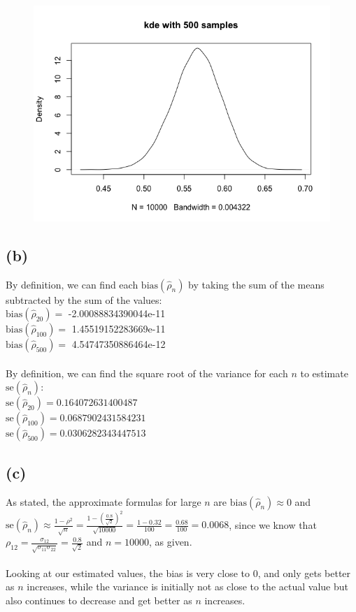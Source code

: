 \documentclass{article}
\begin{document}
{\begin{figure}[t!]
\end{figure}
\begin{figure}[t!]
  \centering
  \includegraphics[width=450pt]{hw5_2a_500.png}
\end{figure}
\newpage

\subsection*{(b)}

By definition, we can find each $\text{bias}(\hat{\rho}_n)$ by taking the sum of the means subtracted by the sum of the values: \\
$\text{bias}(\hat{\rho}_{20}) = 
$ -2.00088834390044e-11 \\
$\text{bias}(\hat{\rho}_{100}) = $ 1.45519152283669e-11 \\
$\text{bias}(\hat{\rho}_{500}) = $ 4.54747350886464e-12 \\ \\
By definition, we can find the square root of the variance for each $n$ to estimate $\text{se}(\hat{\rho}_n)$: \\
$\text{se}(\hat{\rho}_{20}) = 0.164072631400487$ \\
$\text{se}(\hat{\rho}_{100}) = 0.0687902431584231$ \\
$\text{se}(\hat{\rho}_{500}) = 0.0306282343447513$

\subsection*{(c)}

As stated, the approximate formulas for large $n$ are $\text{bias}(\hat{\rho}_n) \approx 0$ and $\text{se}(\hat{\rho}_n) \approx \frac{1-\rho^2}{\sqrt{n}} = \frac{1 - (\frac{0.8}{\sqrt{2}})^2}{\sqrt{10000}} = \frac{1 - 0.32}{100} = \frac{0.68}{100} = 0.0068$, since we know that $\rho_{12} = \frac{\sigma_{12}}{\sqrt{\sigma_{11}\sigma_{22}}} = \frac{0.8}{\sqrt{2}}$ and $n = 10000$, as given. \\ \\
Looking at our estimated values, the bias is very close to 0, and only gets better as $n$ increases, while the variance is initially not as close to the actual value but also continues to decrease and get better as $n$ increases. 
\newpage

}
\end{document}
